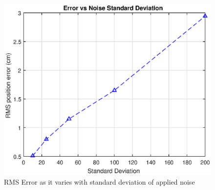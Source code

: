 \documentclass[12pt]{article}
\begin{document}
\begin{figure}[h]
	\centering %
	\includegraphics[width=.6\textwidth]{errVstd.eps}
	\caption{RMS Error as it varies with standard deviation of applied noise} \label{errVstd}
\end{figure}
\end{document}
